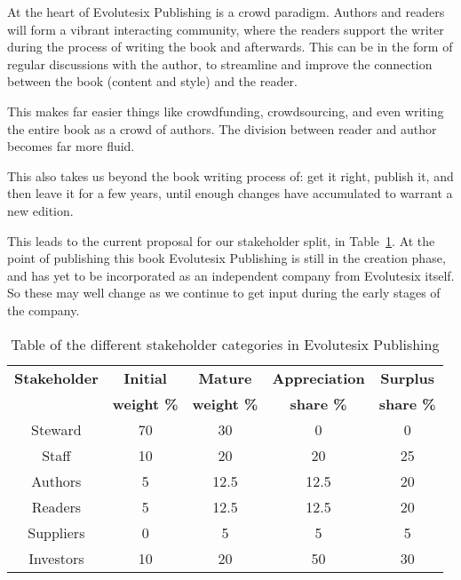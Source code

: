 At the heart of Evolutesix Publishing is a crowd paradigm. Authors and readers will form a vibrant interacting community, where the readers support the writer during the process of writing the book and afterwards. This can be in the form of regular discussions with the author, to streamline and improve the connection between the book (content and style) and the reader.


This makes far easier things like crowdfunding, crowdsourcing, and even writing the entire book as a crowd of authors. The division between reader and author becomes far more fluid.


This also takes us beyond the book writing process of: get it right, publish it, and then leave it for a few years, until enough changes have accumulated to warrant a new edition.


This leads to the current proposal for our stakeholder split, in Table~\ref{table:publishing-stakeholders}. At the point of publishing this book Evolutesix Publishing is still in the creation phase, and has yet to be incorporated as an independent company from Evolutesix itself. So these may well change as we continue to get input during the early stages of the company.


\begin{table}[htbp]
\centering  
\begin{tabular}{ c  c  c  c  c  }
\toprule
\textbf{Stakeholder} & \textbf{Initial } & \textbf{Mature }& \textbf{Appreciation }& \textbf{Surplus} \\
\textbf{} & \textbf{weight \%} & \textbf{weight \%}& \textbf{share \%}& \textbf{share \%} \\
        \midrule
 Steward  & 70 & 30     & 0       & 0 \\
 Staff        & 10  & 20    & 20     & 25 \\
 Authors   & 5   & 12.5  & 12.5  & 20 \\
 Readers  & 5   & 12.5  & 12.5  & 20 \\
 Suppliers & 0   & 5       & 5       & 5 \\
 Investors & 10 & 20     & 50     & 30 \\
\bottomrule
\end{tabular}
\caption[Stakeholder categories in Evolutesix Publishing]{Table of the different stakeholder categories in Evolutesix Publishing}
\label{table:publishing-stakeholders}
\end{table}






